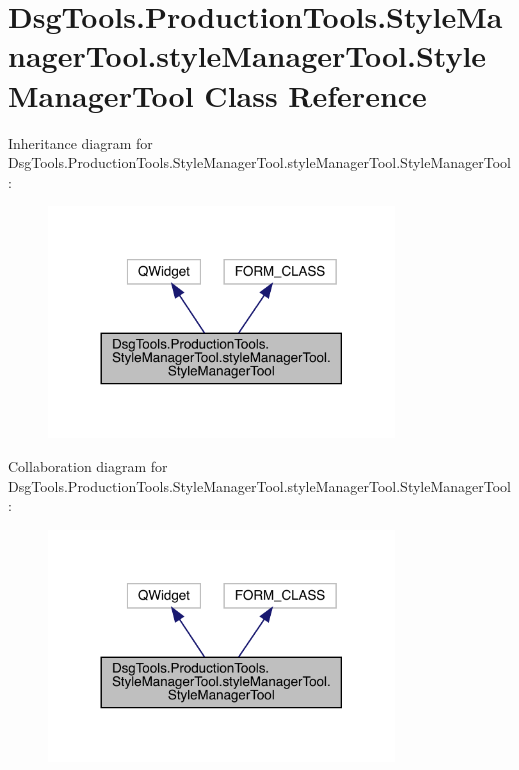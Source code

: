 \hypertarget{class_dsg_tools_1_1_production_tools_1_1_style_manager_tool_1_1style_manager_tool_1_1_style_manager_tool}{}\section{Dsg\+Tools.\+Production\+Tools.\+Style\+Manager\+Tool.\+style\+Manager\+Tool.\+Style\+Manager\+Tool Class Reference}
\label{class_dsg_tools_1_1_production_tools_1_1_style_manager_tool_1_1style_manager_tool_1_1_style_manager_tool}


Inheritance diagram for Dsg\+Tools.\+Production\+Tools.\+Style\+Manager\+Tool.\+style\+Manager\+Tool.\+Style\+Manager\+Tool\+:
\nopagebreak
\begin{figure}[H]
\begin{center}
\leavevmode
\includegraphics[width=260pt]{class_dsg_tools_1_1_production_tools_1_1_style_manager_tool_1_1style_manager_tool_1_1_style_manager_tool__inherit__graph}
\end{center}
\end{figure}


Collaboration diagram for Dsg\+Tools.\+Production\+Tools.\+Style\+Manager\+Tool.\+style\+Manager\+Tool.\+Style\+Manager\+Tool\+:
\nopagebreak
\begin{figure}[H]
\begin{center}
\leavevmode
\includegraphics[width=260pt]{class_dsg_tools_1_1_production_tools_1_1_style_manager_tool_1_1style_manager_tool_1_1_style_manager_tool__coll__graph}
\end{center}
\end{figure}
